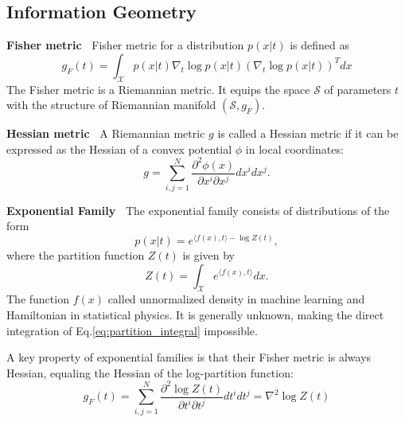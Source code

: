 \documentclass{article}
\theoremstyle{plain}
\theoremstyle{definition}
\theoremstyle{remark}
\begin{document}
\subsection{Information Geometry}

\textbf{Fisher metric~} Fisher metric for a distribution $p(x|t)$ is defined as 
\begin{equation}
    g_{F}(t) = \int_{\mathcal{X}} p(x|t) \nabla_{t} \log p(x| t) (\nabla_{t} \log p(x|t))^{T} dx
    \label{fisher}
\end{equation}
The Fisher metric is a Riemannian metric. It equips the space $\mathcal{S}$ of parameters $t$ with the structure of Riemannian manifold $(\mathcal{S}, g_{F})$.

\textbf{Hessian metric~} A Riemannian metric $g$ is called a Hessian metric if it can be expressed as the Hessian of a convex potential $\phi$ in local coordinates:
\begin{equation}
    g = \sum\limits_{i,j=1}^{N}\frac{\partial^{2} \phi(x)}{\partial x^{i} \partial x^{j}} dx^{i} dx^{j}.
\end{equation}

\textbf{Exponential Family~} The exponential family consists of distributions of the form
\begin{equation}
\label{eq:exponential_family}
    p(x|t) = e^{\langle f(x), t \rangle - \log Z(t)},
\end{equation}
where the partition function $Z(t)$ is given by
\begin{equation}
    \label{eq:partition_integral}
    Z(t) = \int_{\mathcal{X}} e^{\langle f(x), t \rangle} dx.
\end{equation}
The function $f(x)$ called unnormalized density in machine learning and Hamiltonian in statistical physics. It is generally unknown, making the direct integration of Eq.\ref{eq:partition_integral} impossible. 

A key property of exponential families is that their Fisher metric is always Hessian, equaling the Hessian of the log-partition function:
\begin{equation}
\label{eq:free_energy_geometry}
    g_F(t) = \sum\limits_{i,j=1}^{N}\frac{\partial^{2} \log Z(t)}{\partial t^{i} \partial t^{j}} dt^{i} dt^{j} = \nabla^2 \log Z(t)
\end{equation}
\end{document}

